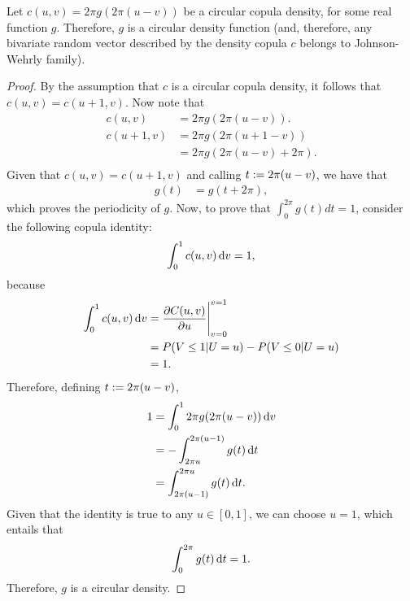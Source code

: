 \documentclass[oneside,11pt]{article}
\begin{document}
\begin{lemma}\label{lemma-g-copula-circular}
    Let $c(u,v) = 2 \pi g(2 \pi (u-v))$ be a circular copula density, for some real function $g$. Therefore, $g$ is a circular density function (and, therefore, any bivariate random vector described by the density copula $c$ belongs to Johnson-Wehrly family).
\end{lemma}
\begin{proof}
    By the assumption that $c$ is a circular copula density, it follows that $c(u,v) = c(u+1,v)$. Now note that
    \begin{align*}
        c(u,v) &= 2 \pi g(2 \pi (u-v)). \\
        c(u+1,v) &= 2 \pi g(2 \pi (u+1-v)) \\
        &= 2 \pi g(2 \pi (u-v) + 2 \pi). \\
    \end{align*}
    Given that $c(u,v) = c(u+1,v)$ and calling $t := 2 \pi (u-v)$, we have that
    \begin{align*}
        g(t) &= g(t + 2 \pi),
    \end{align*}
    which proves the periodicity of $g$. Now, to prove that $\int_{0}^{2 \pi} g(t) dt = 1$, consider the following copula identity:
    \begin{align*}
        \int_{0}^{1} c(u,v) \,\mathrm{d} v = 1,
    \end{align*}
    because
    \begin{align*}
        \int_{0}^{1} c(u,v) \,\mathrm{d} v &= \frac{\partial C(u,v)}{\partial u} \Bigg|_{v=0}^{v=1} \\
        &= P(V \le 1 | U=u) - P(V \le 0 | U=u) \\
        &= 1.
    \end{align*}
    Therefore, defining $t := 2 \pi (u-v)$,
    \begin{align*}
        1 &= \int_{0}^{1} 2 \pi g(2 \pi (u-v)) \,\mathrm{d} v \\
        &= - \int_{2 \pi u}^{2 \pi (u-1)} g(t) \,\mathrm{d} t \\
        &= \int_{2 \pi (u-1)}^{2 \pi u} g(t) \,\mathrm{d} t. \\
    \end{align*}
    Given that the identity is true to any $u \in [0,1]$, we can choose $u=1$, which entails that
    \begin{align*}
        \int_{0}^{2 \pi} g(t) \,\mathrm{d} t = 1.
    \end{align*}
    Therefore, $g$ is a circular density.
\end{proof}
\end{document}

